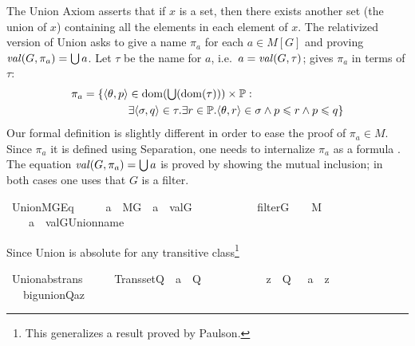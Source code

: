The Union Axiom asserts that if $x$ is a set, then there exists
another set (the union of $x$) containing all the elements in each
element of $x$. The relativized version of Union asks to give a name
$\pi_a$ for each $a\in M[G]$ and proving $\operatorname{\mathit{val}}(G,\pi_a)=\mathop{\textstyle\bigcup} a$.
Let $\tau$ be the name for $a$, i.e.\ $a=\operatorname{\mathit{val}}(G,\tau)$; 
\citet{kunen2011set} gives $\pi_a$ in terms of $\tau$:
\begin{align*}
  \pi_a = \{\langle\theta,p \rangle &\in \operatorname{dom}(\mathop{\textstyle\bigcup}(\operatorname{dom}(\tau))) \times \mathbb{P} : \\
&\exists \langle\sigma,q\rangle  \in \tau .
 \exists r \in \mathbb{P} . \langle \theta,r\rangle \in \sigma \wedge
    p\leqslant r \wedge p \leqslant q \}
\end{align*}
Our formal definition is slightly different in order to ease the proof of
$\pi_a \in M$.  Since $\pi_a$ it is defined using Separation, one
needs to internalize $\pi_a$ as a formula
. The
equation $\operatorname{\mathit{val}}(G,\pi_a)=\mathop{\textstyle\bigcup} a$ is proved by showing the mutual
inclusion; in both cases one uses that $G$ is a filter.
\begin{isabelle}
  \isamarkupfalse%
\ Union{\isacharunderscore}MG{\isacharunderscore}Eq\ {\isacharcolon}\ \isanewline
\ \ \ {\isachardoublequoteopen}a\ {\isasymin}\ M{\isacharbrackleft}G{\isacharbrackright}{\isachardoublequoteclose}\ \ {\isachardoublequoteopen}a\ {\isacharequal}\ val{\isacharparenleft}G{\isacharcomma}{\isasymtau}{\isacharparenright}{\isachardoublequoteclose}\ \isanewline
\ \ \ \ \ \ \ \ \ \ {\isachardoublequoteopen}filter{\isacharparenleft}G{\isacharparenright}{\isachardoublequoteclose}\ \ {\isachardoublequoteopen}{\isasymtau}\ {\isasymin}\ M{\isachardoublequoteclose}\isanewline
\ \ \ {\isachardoublequoteopen}{\isasymUnion}\ a\ {\isacharequal}\ val{\isacharparenleft}G{\isacharcomma}Union{\isacharunderscore}name{\isacharparenleft}{\isasymtau}{\isacharparenright}{\isacharparenright}{\isachardoublequoteclose}
\end{isabelle}
Since Union is absolute for any transitive class\footnote{This
  generalizes a result proved by Paulson.}
\begin{isabelle}
\isamarkupfalse%
\ Union{\isacharunderscore}abs{\isacharunderscore}trans\ {\isacharcolon}\ \isanewline
\ \ \ {\isachardoublequoteopen}Transset{\isacharparenleft}Q{\isacharparenright}{\isachardoublequoteclose}\ \ {\isachardoublequoteopen}a\ {\isasymin}\ Q{\isachardoublequoteclose}\ \isanewline
\ \ \ \ \ \ \ \ \ \ {\isachardoublequoteopen}z\ {\isasymin}\ Q{\isachardoublequoteclose}\ \ {\isachardoublequoteopen}{\isasymUnion}\ a\ {\isacharequal}\ z{\isachardoublequoteclose}\isanewline
\ \ \ {\isachardoublequoteopen}big{\isacharunderscore}union{\isacharparenleft}{\isacharhash}{\isacharhash}Q{\isacharcomma}a{\isacharcomma}z{\isacharparenright}{\isachardoublequoteclose}
\end{isabelle}
